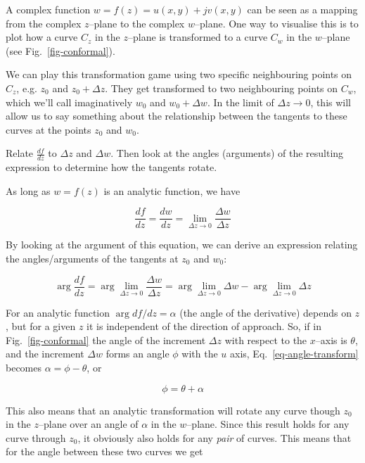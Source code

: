 A complex function $w = f(z) = u(x,y)+jv(x,y)$ can be seen as a mapping from the complex $z$--plane to the complex $w$--plane. One way to visualise this is to plot how a curve $C_z$ in the $z$--plane is transformed to a curve $C_w$ in the $w$--plane (see Fig.~\ref{fig-conformal}).

We can play this transformation game using two specific neighbouring points on $C_z$, e.g. $z_0$ and $z_0+\Delta z$. They get transformed to two neighbouring points on $C_w$, which we'll call imaginatively $w_0$ and $w_0+\Delta w$. In the limit of $\Delta z \to 0$, this will allow us to say something about the relationship between the tangents to these curves at the points $z_0$ and $w_0$.

\begin{cue}
Relate $\frac{df}{dz}$ to $\Delta z$ and $\Delta w$. Then look at the angles (arguments) of the resulting expression to determine how the tangents rotate.
\end{cue}

As long as $w=f(z)$ is an analytic function, we have

\begin{equation}
\frac{df}{dz} = \frac{dw}{dz} = \lim_{\Delta z \to 0} \frac{\Delta w}{\Delta z}
\end{equation}

By looking at the argument of this equation, we can derive an expression relating the angles/arguments of the tangents at $z_0$ and $w_0$:

\begin{equation}
\arg \frac{df}{dz} = \arg \lim_{\Delta z \to 0} \frac{\Delta w}{\Delta z} = \arg
\lim_{\Delta z   \to 0} \Delta w - \arg \lim_{\Delta z \to 0} \Delta z
\label{eq-angle-transform}
\end{equation} 

For an analytic function $\arg df / dz = \alpha$ (the angle of the derivative) depends on $z$, but for a given $z$ it is independent of the direction of approach. So, if in Fig.~\ref{fig-conformal} the angle of the increment $\Delta z$ with respect to the $x$--axis is $\theta$, and the increment $\Delta w$ forms an angle $\phi$ with the $u$ axis, Eq.~\ref{eq-angle-transform} becomes $\alpha = \phi - \theta $, or

\begin{equation}
\phi = \theta + \alpha
\end{equation}

This also means that an analytic transformation will rotate any curve though $z_0$ in the $z$--plane over an angle of $\alpha$ in the $w$--plane. Since this result holds for any curve through $z_0$, it obviously also holds for any \emph{pair} of curves. This means that for the angle between these two curves we get

